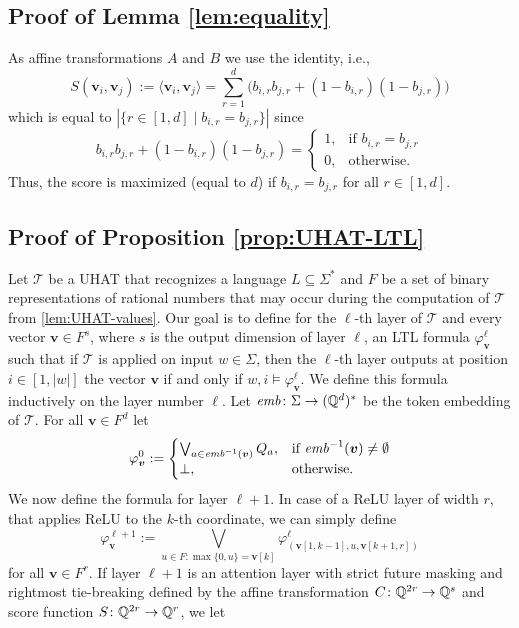 \subsection{Proof of Lemma \ref{lem:equality}}
As affine transformations $A$ and $B$ we use the identity, i.e.,
\[S(\bm v_i,\bm v_j) := \langle \bm v_i, \bm v_j \rangle = \sum_{r=1}^d \big(b_{i,r} b_{j,r} + (1-b_{i,r})(1-b_{j,r})\big)\]
which is equal to $|\{r \in [1,d] \mid b_{i,r} = b_{j,r}\}|$ since
\[b_{i,r} b_{j,r} + (1-b_{i,r})(1-b_{j,r}) = \begin{cases}
1, &\text{if } b_{i,r} = b_{j,r}\\
0, &\text{otherwise.}
\end{cases}\]
Thus, the score is maximized (equal to $d$) if $b_{i,r} = b_{j,r}$ for all $r \in [1,d]$.


\subsection{Proof of Proposition \ref{prop:UHAT-LTL}}
Let $\mathcal{T}$ be a UHAT that recognizes a language $L \subseteq \Sigma^*$ and 
$F$ be a set of binary representations of rational numbers
that may occur during the computation of $\mathcal{T}$ from \cref{lem:UHAT-values}. 
Our goal is to define for the $\ell$-th layer of $\mathcal{T}$ and every vector $\bm v \in F^s$,
where $s$ is the output dimension of layer $\ell$,
an LTL formula $\varphi_{\bm v}^\ell$ such that if $\mathcal{T}$ is applied on input $w \in \Sigma$,
then the $\ell$-th layer outputs at position $i \in [1,|w|]$ the vector $\bm v$ if and only if
$w,i \models \varphi_{\bm v}^\ell$.
We define this formula inductively on the layer number $\ell$.
Let $\mathit{emb} \colon \Sigma \to (\mathbb{Q}^d)^*$ be the token embedding of $\mathcal{T}$.
For all $\bm v \in F^d$ let
\[\varphi_{\bm v}^0 := \begin{cases}
\bigvee_{a \in \mathit{emb}^{-1}(\bm v)} Q_a, &\text{if } \mathit{emb}^{-1}(\bm v) \ne \emptyset\\
\bot, &\text{otherwise.}
\end{cases}\]
We now define the formula for layer $\ell+1$.
In case of a ReLU layer of width $r$, that applies ReLU to the $k$-th coordinate, we can simply define
\[\varphi_{\bm v}^{\ell+1} := \bigvee_{u \in F \colon \max\{0,u\} = \bm v[k]} \varphi_{(\bm v[1,k-1],u,\bm v[k+1,r])}^\ell\]
for all $\bm v \in F^r$.
If layer $\ell+1$ is an attention layer with strict future masking and rightmost tie-breaking defined by the affine transformation
$C \colon \mathbb{Q}^{2r} \to \mathbb{Q}^s$ and score function $S \colon \mathbb{Q}^{2r} \to \mathbb{Q}^r$, we let
